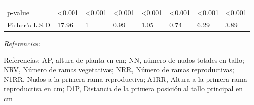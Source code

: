 \documentclass[12pt,oneside]{reedthesis}
\begin{document}
\begin{table}[!h]
{\begin{threeparttable}
\begin{tabular}[t]{llllllll}
 &  &  &  &  &  &  & \\
p-value & <0.001 & <0.001 & <0.001 & <0.001 & <0.001 & <0.001 & <0.001\\
Fisher’s L.S.D & 17.96 & 1 & 0.99 & 1.05 & 0.74 & 6.29 & 3.89\\
\bottomrule
\end{tabular}
\begin{tablenotes}[para]
\item \textit{Referencias:} 
\item Referencias: AP, altura de planta en cm; NN, número de nudos totales en tallo; NRV, Número de ramas vegetativas; NRR, Número de ramas reproductivas; N1RR, Nudos a la primera rama reproductiva; A1RR, Altura a la primera rama reproductiva en cm; D1P, Distancia de la primera posición al tallo principal en cm
\end{tablenotes}
\end{threeparttable}}
\end{table}
\end{document}

